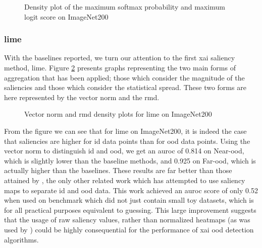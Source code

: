 \documentclass[UKenglish]{uiomasterthesis} %
\theoremstyle{definition}
\begin{document}
\begin{figure}[H]
    \begin{center}
        
    \end{center}
    \caption{Density plot of the maximum softmax probability and maximum logit score on ImageNet200}
    \label{fig:imagenet200logits}
\end{figure}

\subsubsection{\ac{lime}}

With the baselines reported, we turn our attention to the first \ac{xai} saliency method, \ac{lime}. Figure \ref{fig:imagenet200limemeangini} presents graphs representing the two main forms of aggregation that has been applied; those which consider the magnitude of the saliencies and those which consider the statistical spread. These two forms are here represented by the vector norm and the \ac{rmd}.

\begin{figure}[H]
    \begin{center}
        
    \end{center}
    \caption{Vector norm and \acs*{rmd} density plots for \acs*{lime} on ImageNet200}
    \label{fig:imagenet200limemeangini}
\end{figure}

From the figure we can see that for \ac{lime} on ImageNet200, it is indeed the case that saliencies are higher for \ac{id} data points than for \ac{ood} data points. Using the vector norm to distinguish \ac{id} and \ac{ood}, we get an \ac{auroc} of 0.814 on Near-\ac{ood}, which is slightly lower than the baseline methods, and 0.925 on Far-\ac{ood}, which is actually higher than the baselines. These results are far better than those attained by \cite{martinez}, the only other related work which has attempted to use saliency maps to separate \ac{id} and \ac{ood} data. This work achieved an \ac{auroc} score of only 0.52 when used on benchmark which did not just contain small toy datasets, which is for all practical purposes equivalent to guessing. This large improvement suggests that the usage of raw saliency values, rather than normalized heatmaps (as was used by \cite{martinez}) could be highly consequential for the performance of \ac{xai} \ac{ood} detection algorithms.
\end{document}
